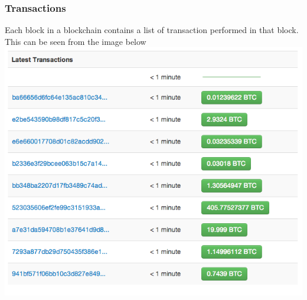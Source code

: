 \documentclass{article}
\begin{document}
 \subsubsection{Transactions}
Each block in a blockchain contains a list of transaction performed in that block. This can be seen from the image below
\\
 \includegraphics[scale=0.25]{blockchain-transactions.png}
\end{document}
